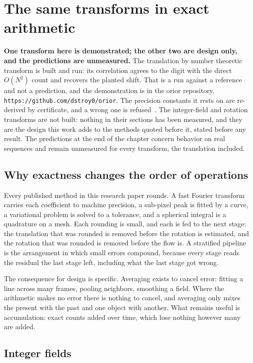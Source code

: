 \chapter{The same transforms in exact arithmetic}

\textbf{One transform here is demonstrated; the other two are design only, and the predictions are
unmeasured.} The translation by number theoretic transform is built and run: its
correlation agrees to the digit with the direct \(O(N^2)\) count and recovers the planted shift. That
is a run against a reference and not a prediction, and the demonstration is in the orior repository,
\texttt{https://github.com/dstroy0/orior}. The precision constants it rests
on are re-derived by certificate, and a wrong one is refused~\cite{src:Quigg-twiddle-constants}. The
integer-field and rotation transforms are not built: nothing in their sections has been measured, and
they are the design this work adds to the methods quoted before it, stated before any result. The
predictions at the end of the chapter concern behavior on real sequences and remain unmeasured for
every transform, the translation included.

\section{Why exactness changes the order of operations}

Every published method in this research paper rounds. A fast Fourier transform carries each coefficient to
machine precision, a sub-pixel peak is fitted by a curve, a variational problem is solved to a
tolerance, and a spherical integral is a quadrature on a mesh. Each rounding is small, and each is
fed to the next stage: the translation that was rounded is removed before the rotation is estimated,
and the rotation that was rounded is removed before the flow is. A stratified pipeline is the
arrangement in which small errors compound, because every stage reads the residual the last stage
left, including what the last stage got wrong.

The consequence for design is specific. Averaging exists to cancel error: fitting a line across many
frames, pooling neighbors, smoothing a field. Where the arithmetic makes no error there is nothing to
cancel, and averaging only mixes the present with the past and one object with another. What remains
useful is accumulation: exact counts added over time, which lose nothing however many are added.

\section{Integer fields}

